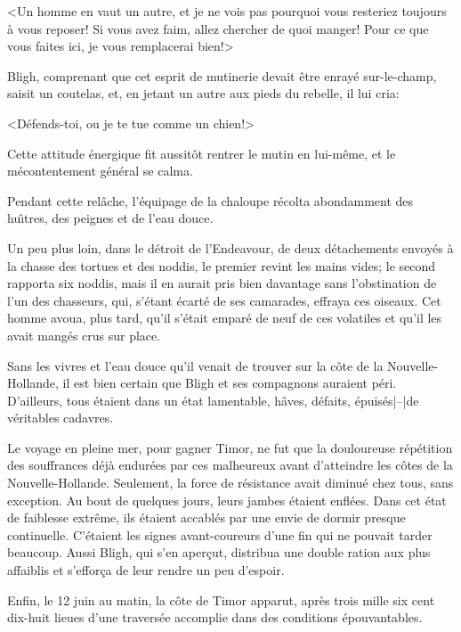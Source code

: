 <Un homme en vaut un autre, et je ne vois pas pourquoi
vous resteriez toujours \`a vous reposer!
Si vous avez faim, allez chercher de quoi manger!
Pour ce que vous faites ici, je vous remplacerai bien!>

Bligh, comprenant que cet esprit de mutinerie devait
\^etre enray\'e sur-le-champ, saisit un coutelas,
et, en jetant un autre aux pieds du rebelle, il lui cria:

<D\'efends-toi, ou je te tue comme un chien!>

Cette attitude \'energique fit aussit\^ot rentrer
le mutin en lui-m\^eme, et le m\'econtentement
g\'en\'eral se calma.

Pendant cette rel\^ache, l'\'equipage de la chaloupe
r\'ecolta abondamment des hu{\^\i}tres, des peignes%
 et de l'eau douce.

Un peu plus loin, dans le d\'etroit de l'Endeavour,
de deux d\'e\-ta\-che\-ments envoy\'es \`a la chasse
des tortues et des noddis, le premier revint les mains vides;
le second rapporta six noddis, mais il en aurait pris bien
davantage sans l'obstination de l'un des chasseurs, qui,
s'\'etant \'ecart\'e de ses camarades,
effraya ces oiseaux. Cet homme avoua, plus tard,
qu'il s'\'etait empar\'e de neuf de ces
volatiles et qu'il les avait mang\'es crus sur place.

Sans les vivres et l'eau douce qu'il venait de trouver sur
la c\^ote de la Nouvelle-Hollande, il est bien certain que
Bligh et ses compagnons auraient p\'eri. D'ailleurs, tous
\'etaient dans un \'etat lamentable, h\^aves, d\'efaits,
\'epuis\'es|--|de v\'eritables cadavres.

Le voyage en pleine mer, pour gagner Timor, ne fut que
la douloureuse r\'ep\'etition des souffrances d\'ej\`a
endur\'ees par ces malheureux avant d'atteindre les
c\^otes de la Nouvelle-Hollande.
Seulement, la force de r\'esistance avait diminu\'e
chez tous, sans exception. Au bout de quelques jours,
leurs jambes \'etaient enfl\'ees. Dans cet \'etat de
faiblesse extr\^eme, ils \'etaient accabl\'es par une
envie de dormir presque continuelle. C'\'etaient
les signes avant-coureurs d'une fin qui ne pouvait
tarder beaucoup. Aussi Bligh, qui s'en aper\c{c}ut,
distribua une double ration aux plus affaiblis
et s'effor\c{c}a de leur rendre un peu d'espoir.

Enfin, le 12 juin au matin, la c\^ote de Timor apparut,
apr\`es trois mille six cent dix-huit lieues d'une
travers\'ee accomplie dans des conditions \'epouvantables.

